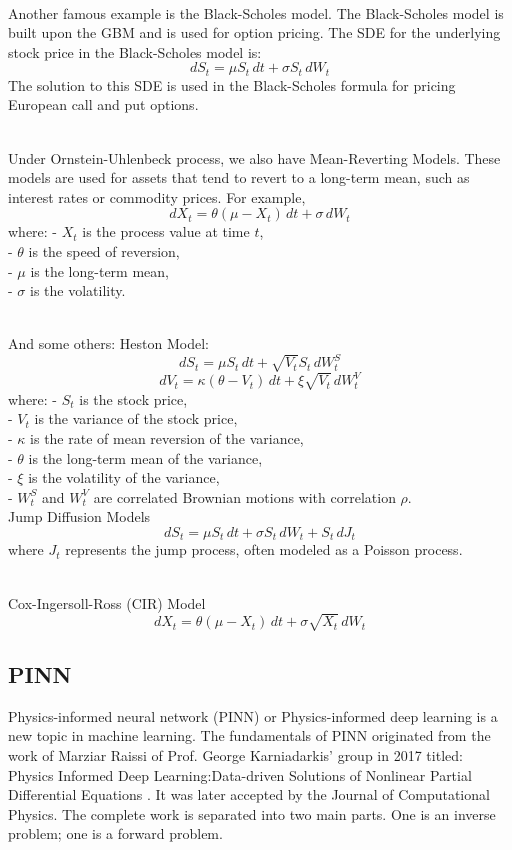 \documentclass[12pt]{article}
\begin{document}
\\
Another famous example is the Black-Scholes model. The Black-Scholes model is built upon the GBM and is used for option pricing. The SDE for the underlying stock price in the Black-Scholes model is:
\[
dS_t = \mu S_t \, dt + \sigma S_t \, dW_t
\]
The solution to this SDE is used in the Black-Scholes formula for pricing European call and put options.

\\
Under Ornstein-Uhlenbeck process, we also have Mean-Reverting Models. These models are used for assets that tend to revert to a long-term mean, such as interest rates or commodity prices. For example, 
\[
dX_t = \theta (\mu - X_t) \, dt + \sigma \, dW_t
\]
where:
- \(X_t\) is the process value at time \(t\),\\
- \(\theta\) is the speed of reversion,\\
- \(\mu\) is the long-term mean,\\
- \(\sigma\) is the volatility.

\\
And some others:
Heston Model:
\[
dS_t = \mu S_t \, dt + \sqrt{V_t} S_t \, dW_t^S
\]
\[
dV_t = \kappa (\theta - V_t) \, dt + \xi \sqrt{V_t} \, dW_t^V
\]
where:
- \(S_t\) is the stock price,\\
- \(V_t\) is the variance of the stock price,\\
- \(\kappa\) is the rate of mean reversion of the variance,\\
- \(\theta\) is the long-term mean of the variance,\\
- \(\xi\) is the volatility of the variance,\\
- \(W_t^S\) and \(W_t^V\) are correlated Brownian motions with correlation \(\rho\).
\\
Jump Diffusion Models
\[
dS_t = \mu S_t \, dt + \sigma S_t \, dW_t + S_t \, dJ_t
\]
where \(J_t\) represents the jump process, often modeled as a Poisson process.

\\
Cox-Ingersoll-Ross (CIR) Model
\[
dX_t = \theta (\mu - X_t) \, dt + \sigma \sqrt{X_t} \, dW_t
\]

\subsection{PINN}
\label{pinn}
Physics-informed neural network (PINN) or Physics-informed deep learning is a new topic in machine learning. The fundamentals of PINN originated from the work of Marziar Raissi of Prof. George Karniadarkis' group in 2017 titled: Physics Informed Deep Learning:Data-driven Solutions of Nonlinear Partial Differential Equations \citep{RAISSI2019686}. It was later accepted by the Journal of Computational Physics. The complete work is separated into two main parts. One is an inverse problem; one is a forward problem.
\end{document}
